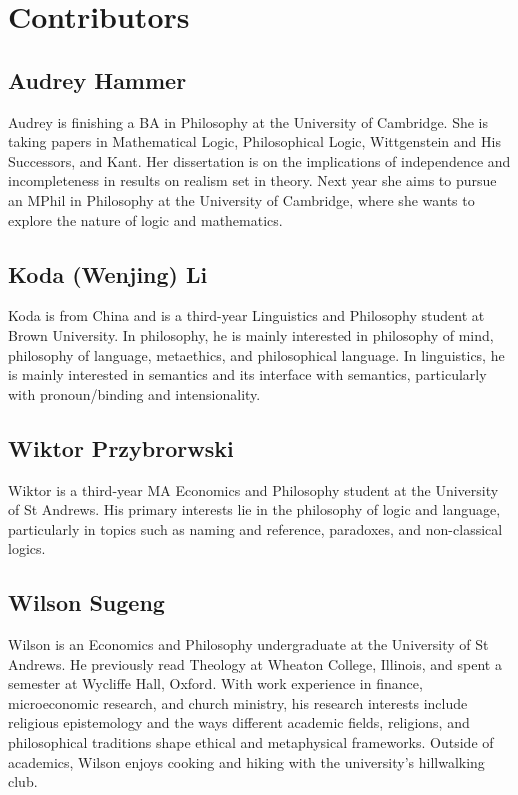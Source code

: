 \chapter{Contributors}

\section*{Audrey Hammer}

Audrey is finishing a BA in Philosophy at the University of Cambridge.
She is taking papers in Mathematical Logic, Philosophical Logic,
Wittgenstein and His Successors, and Kant. Her dissertation is on the
implications of independence and incompleteness in results on realism
set in theory. Next year she aims to pursue an MPhil in Philosophy at
the University of Cambridge, where she wants to explore the nature of
logic and mathematics.

\section*{Koda (Wenjing) Li}

Koda is from China and is a third-year Linguistics and Philosophy
student at Brown University. In philosophy, he is mainly interested in
philosophy of mind, philosophy of language, metaethics, and
philosophical language.
In linguistics, he is mainly interested in semantics and its interface
with semantics, particularly with pronoun/binding and intensionality.

\section*{Wiktor Przybrorwski}

Wiktor is a third-year MA Economics and Philosophy student at the
University of St Andrews. His primary interests lie in the philosophy
of logic and language, particularly in topics such as naming and
reference, paradoxes, and non-classical logics.

\section*{Wilson Sugeng}

Wilson is an Economics and Philosophy undergraduate at the University of
St Andrews. He previously read Theology at Wheaton College, Illinois,
and spent a semester at Wycliffe Hall, Oxford. With work experience in
finance, microeconomic research, and church ministry, his research
interests include religious epistemology and the ways different academic
fields, religions, and philosophical traditions shape ethical and
metaphysical frameworks. Outside of academics, Wilson enjoys cooking and
hiking with the university's hillwalking club.
